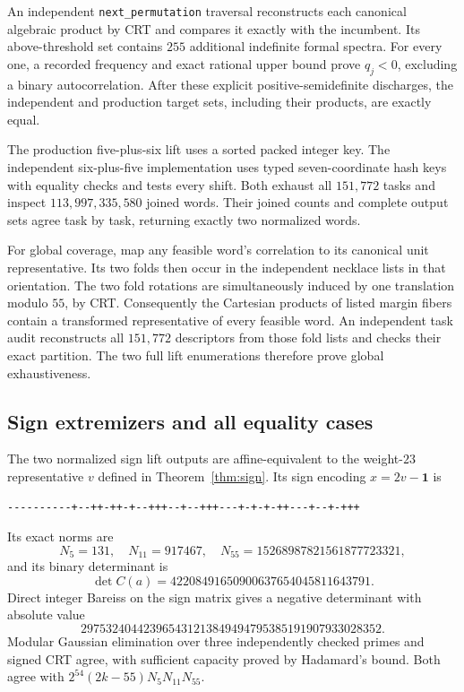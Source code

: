 \documentclass[11pt,a4paper]{article}
\theoremstyle{remark}
\begin{document}
An independent \texttt{next\_permutation} traversal reconstructs
each canonical algebraic product by CRT and compares it exactly
with the incumbent. Its above-threshold set contains $255$
additional indefinite formal spectra. For every one, a recorded frequency and exact rational
upper bound prove $q_j<0$, excluding a binary autocorrelation.
After these explicit positive-semidefinite discharges, the independent
and production target sets, including their products, are exactly equal.

The production five-plus-six lift uses a sorted packed integer key.
The independent six-plus-five implementation uses typed seven-coordinate
hash keys with equality checks and tests every shift. Both exhaust all
$151,772$ tasks and inspect $113,997,335,580$ joined words.
Their joined counts and complete output sets agree task by task,
returning exactly two normalized words.

For global coverage, map any feasible word's correlation to its
canonical unit representative. Its two folds then occur in the
independent necklace lists in that orientation. The two fold rotations
are simultaneously induced by one translation modulo $55$, by CRT.
Consequently the Cartesian products of listed margin fibers contain
a transformed representative of every feasible word. An independent
task audit reconstructs all $151,772$ descriptors from those fold lists
and checks their exact partition. The two full lift enumerations
therefore prove global exhaustiveness.


\subsection{Sign extremizers and all equality cases}

The two normalized sign lift outputs are affine-equivalent to
the weight-$23$ representative $v$ defined in
Theorem~\ref{thm:sign}. Its sign encoding $x=2v-\mathbf1$ is
\begin{lstlisting}
----------+--++-++-+--+++--+--+++---+-+-+-++---+--+-+++
\end{lstlisting}
Its exact norms are
\[
 N_5=131,\quad N_{11}=917467,\quad N_{55}=15268987821561877723321,
\]
and its binary determinant is
\[
 \det C(a)=42208491650900637654045811643791.
\]
Direct integer Bareiss on the sign matrix gives a negative determinant
with absolute value
\[
 297532404423965431213849494795385191907933028352.
\]
Modular Gaussian elimination over three independently checked primes
and signed CRT agree, with sufficient capacity proved by Hadamard's
bound. Both agree with $2^{54}(2k-55)N_5N_{11}N_{55}$.
\end{document}
